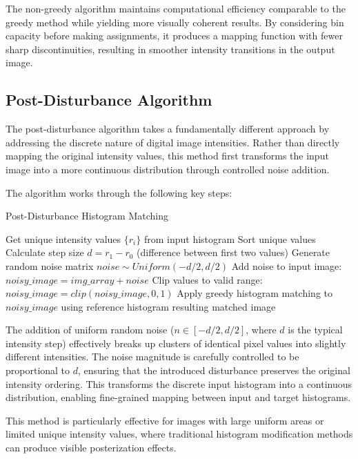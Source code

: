 \documentclass[12pt,a4paper]{article}
\begin{document}
The non-greedy algorithm maintains computational efficiency comparable to the greedy method while yielding more visually coherent results. By considering bin capacity before making assignments, it produces a mapping function with fewer sharp discontinuities, resulting in smoother intensity transitions in the output image.

\subsection{Post-Disturbance Algorithm}

The post-disturbance algorithm takes a fundamentally different approach by addressing the discrete nature of digital image intensities. Rather than directly mapping the original intensity values, this method first transforms the input image into a more continuous distribution through controlled noise addition.

The algorithm works through the following key steps:

\begin{algorithm}[H]
    \caption{Post-Disturbance Histogram Matching}
    \begin{algorithmic}[1]
        \State Get unique intensity values $\{r_i\}$ from input histogram
        \State Sort unique values
        \State Calculate step size $d = r_1 - r_0$ (difference between first two values)
        \State Generate random noise matrix $noise \sim Uniform(-d/2, d/2)$ 
        \State Add noise to input image: $noisy\_image = img\_array + noise$
        \State Clip values to valid range: $noisy\_image = clip(noisy\_image, 0, 1)$
        \State Apply greedy histogram matching to $noisy\_image$ using reference histogram
        \State \Return resulting matched image
    \end{algorithmic}
\end{algorithm}

The addition of uniform random noise ($n \in [-d/2, d/2]$, where $d$ is the typical intensity step) effectively breaks up clusters of identical pixel values into slightly different intensities. The noise magnitude is carefully controlled to be proportional to $d$, ensuring that the introduced disturbance preserves the original intensity ordering. This transforms the discrete input histogram into a continuous distribution, enabling fine-grained mapping between input and target histograms. 

This method is particularly effective for images with large uniform areas or limited unique intensity values, where traditional histogram modification methods can produce visible posterization effects.
\end{document}
